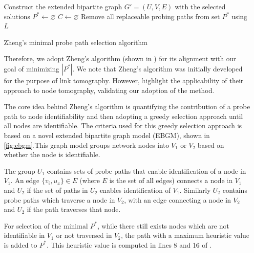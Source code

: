 \begin{algorithm}[H]
    
    Construct the extended bipartite graph $G'=(U,V,E)$ with the selected solutions\;
    $P^* \gets \varnothing$ \;
    $C \gets \varnothing$ \;
    Remove all replaceable probing paths from set $P^*$ using $L$\;
    \caption{Zheng's minimal probe path selection algorithm}
    \label{alg:zhengs}
\end{algorithm}
\noindent Therefore, we adopt Zheng's algorithm (shown in ) for its alignment with our goal of minimizing $|P^*|$. We note that Zheng's algorithm was initially developed for the purpose of link tomography. However, \cite{zheng_minimizing_2013} highlight the applicability of their approach to node tomography, validating our adoption of the method.\par
The core idea behind Zheng's algorithm is quantifying the contribution of a probe path to node identifiability and then adopting a greedy selection approach until all nodes are identifiable. The criteria used for this greedy selection approach is based on a novel extended bipartite graph model (EBGM), shown in \cref{fig:ebgm}.This graph model groups network nodes into $V_1$ or $V_2$ based on whether the node is identifiable.\par
The group $U_1$ contains sets of probe paths that enable identification of a node in $V_1$. An edge $\{v_i, u_x\} \in E$ (where $E$ is the set of all edges) connects a node in $V_1$ and $U_2$ if the set of paths in $U_2$ enables identification of $V_1$. Similarly $U_2$ contains probe paths which traverse a node in $V_2$, with an edge connecting a node in $V_2$ and $U_2$ if the path traverses that node.\par
For selection of the minimal $P^*$, while there still exists nodes which are not identifiable in $V_1$ or not traversed in $V_2$, the path with a maximum heuristic value is added to $P^*$. This heuristic value is computed in lines 8 and 16 of .
